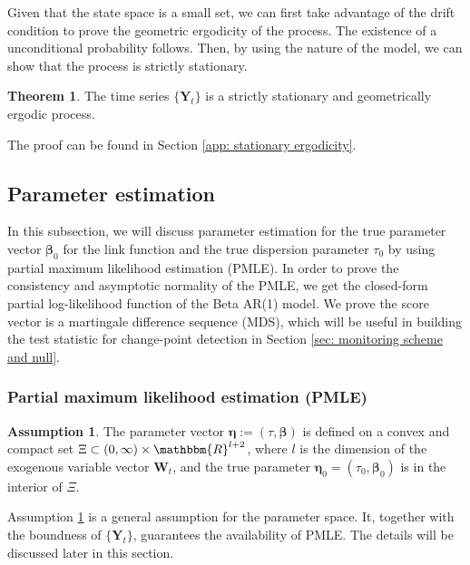 \documentclass{article}
\theoremstyle{definition}
\newtheorem{theorem}{Theorem}[section]
\newtheorem{assumption}{Assumption}
\begin{document}
Given that the state space is a small set, we can first take advantage of the drift condition to prove the geometric ergodicity of the process. The existence of a unconditional probability follows. Then, by using the nature of the model, we can show that the process is strictly stationary. 

\begin{theorem}
\label{theorem:stationary&ergodic}
The time series $\{\bm{Y}_t\}$ is a strictly stationary and geometrically ergodic process.
\end{theorem}
The proof can be found in Section \ref{app: stationary ergodicity}. 
\subsection{Parameter estimation}
\label{subsec: parameter estimation}
In this subsection, we will discuss parameter estimation for the true parameter vector $\bm{\beta}_0$ for the link function and the true dispersion parameter $\tau_0$ by using partial maximum likelihood estimation (PMLE). In order to prove the consistency and asymptotic normality of the PMLE, we get the closed-form partial log-likelihood function of the Beta AR(1) model. We prove the score vector is a martingale difference sequence (MDS), which will be useful in building the test statistic for change-point detection in Section \ref{sec: monitoring scheme and null}. 

\subsubsection{Partial maximum likelihood estimation (PMLE)}

\begin{assumption}
\label{assumption: compact}
The parameter vector $\bm{\eta}:=(\tau,\bm{\beta})$ is defined on a convex and compact set $ \Xi \subset (0,\infty) \times \mathbbm{R}^{l+2}$, where $l$ is the dimension of the exogenous variable vector $\bm{W}_t$, and the true parameter $\bm{\eta}_0 = (\tau_0, \bm{\beta}_0)$ is in the interior of $\Xi$. 
\end{assumption}

Assumption \ref{assumption: compact} is a general assumption for the parameter space. It, together with the boundness of $\{\bm{Y}_t\}$, guarantees the availability of PMLE. The details will be discussed later in this section. 
\end{document}
